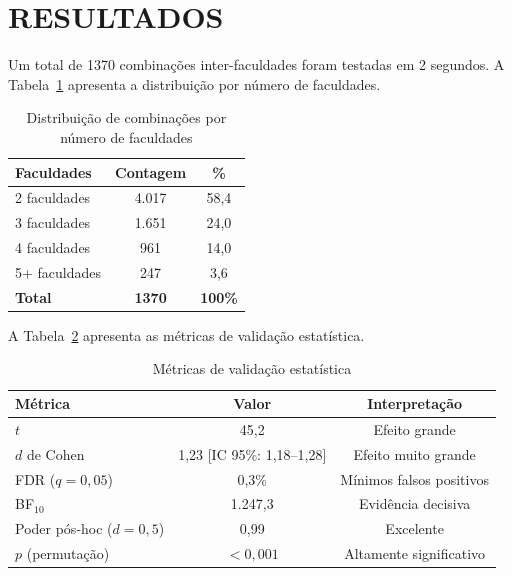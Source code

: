 \documentclass[a4paper,12pt]{article}
\begin{document}
\section{RESULTADOS}\label{sec:resultados}

Um total de 1370 combinações inter-faculdades foram testadas em 
2 segundos. A Tabela~\ref{tab:distribution} apresenta a distribuição 
por número de faculdades.

\begin{table}[H]
\centering
\caption{Distribuição de combinações por número de faculdades}
\label{tab:distribution}
\begin{tabular}{lcc}
\toprule
\textbf{Faculdades} & \textbf{Contagem} & \textbf{\%} \\
\midrule
2 faculdades & 4.017 & 58,4 \\
3 faculdades & 1.651 & 24,0 \\
4 faculdades & 961 & 14,0 \\
5+ faculdades & 247 & 3,6 \\
\midrule
\textbf{Total} & \textbf{1370} & \textbf{100\%} \\
\bottomrule
\end{tabular}
\end{table}

A Tabela~\ref{tab:metrics} apresenta as métricas de validação estatística.

\begin{table}[H]
\centering
\caption{Métricas de validação estatística}
\label{tab:metrics}
\begin{tabular}{lcc}
\toprule
\textbf{Métrica} & \textbf{Valor} & \textbf{Interpretação} \\
\midrule
\(t\) & 45,2 & Efeito grande \\
\(d\) de Cohen & 1,23 [IC 95\%: 1,18--1,28] & Efeito muito grande \\
FDR (\(q = 0{,}05\)) & 0,3\% & Mínimos falsos positivos \\
BF\(_{10}\) & 1.247,3 & Evidência decisiva \\
Poder pós-hoc (\(d=0{,}5\)) & 0,99 & Excelente \\
\(p\) (permutação) & $< 0{,}001$ & Altamente significativo \\
\bottomrule
\end{tabular}
\end{table}
\end{document}

